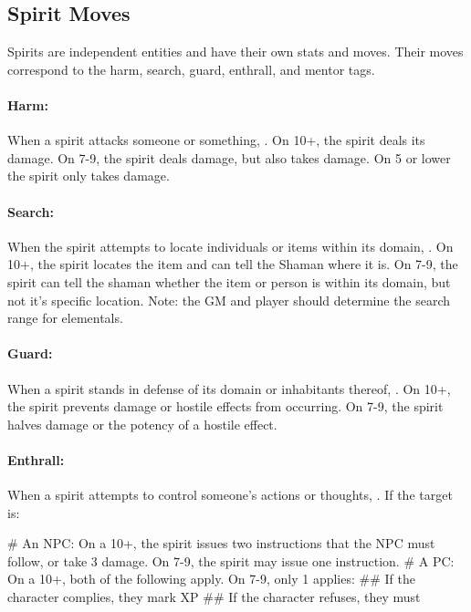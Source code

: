 \subsection{Spirit Moves}

Spirits are independent entities and have their own stats and moves. Their moves correspond to the harm, search, guard, enthrall, and mentor tags.

\paragraph{Harm:} When a spirit attacks someone or something, . On 10+, the spirit deals its damage. On 7-9, the spirit deals damage, but also takes damage. On 5 or lower the spirit only takes damage.

\paragraph{Search:} When the spirit attempts to locate individuals or items within its domain, . On 10+, the spirit locates the item and can tell the Shaman where it is. On 7-9, the spirit can tell the shaman whether the item or person is within its domain, but not it’s specific location. Note: the GM and player should determine the search range for elementals.

\paragraph{Guard:} When a spirit stands in defense of its domain or inhabitants thereof, . On 10+, the spirit prevents damage or hostile effects from occurring. On 7-9, the spirit halves damage or the potency of a hostile effect.

\paragraph{Enthrall:} When a spirit attempts to control someone’s actions or thoughts, . If the target is:
    \begin{easylist}
        # An NPC: On a 10+, the spirit issues two instructions that the NPC must follow, or take 3 damage. On 7-9, the spirit may issue one instruction.
        # A PC: On a 10+, both of the following apply. On 7-9, only 1 applies:
            ## If the character complies, they mark XP
            ## If the character refuses, they must 
    \end{easylist}

